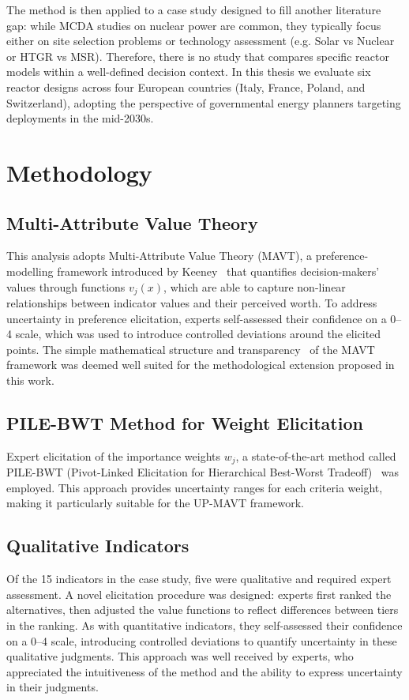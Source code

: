 \documentclass[11pt,a4paper,twocolumn]{article}
\begin{document}
The method is then applied to a case study designed to fill another literature gap: while MCDA studies on nuclear power are common, they typically focus either on site selection problems or technology assessment (e.g. Solar vs Nuclear or HTGR vs MSR). Therefore, there is no study that compares specific reactor models within a well-defined decision context. In this thesis we evaluate six reactor designs across four European countries (Italy, France, Poland, and Switzerland), adopting the perspective of governmental energy planners targeting deployments in the mid-2030s.



\section{Methodology}
\label{sec:methodology}

\subsection{Multi-Attribute Value Theory}
This analysis adopts Multi-Attribute Value Theory (MAVT), a preference-modelling framework introduced by Keeney~\cite{KEENEY1996537} that quantifies decision-makers’ values through functions $v_j(x)$, which are able to capture non-linear relationships between indicator values and their perceived worth. To address uncertainty in preference elicitation, experts self-assessed their confidence on a 0–4 scale, which was used to introduce controlled deviations around the elicited points. The simple mathematical structure and transparency~\cite{SCHUWIRTH2012472} of the MAVT framework was deemed well suited for the methodological extension proposed in this work.

\subsection{PILE-BWT Method for Weight Elicitation}
Expert elicitation of the importance weights $w_j$, a state-of-the-art method called PILE-BWT (Pivot-Linked Elicitation for Hierarchical Best-Worst Tradeoff)~\cite{Huang2026} was employed. This approach provides uncertainty ranges for each criteria weight, making it particularly suitable for the UP-MAVT framework. 

\subsection{Qualitative Indicators}
Of the 15 indicators in the case study, five were qualitative and required expert assessment. A novel elicitation procedure was designed: experts first ranked the alternatives, then adjusted the value functions to reflect differences between tiers in the ranking. As with quantitative indicators, they self-assessed their confidence on a 0–4 scale, introducing controlled deviations to quantify uncertainty in these qualitative judgments. This approach was well received by experts, who appreciated the intuitiveness of the method and the ability to express uncertainty in their judgments.
\end{document}
